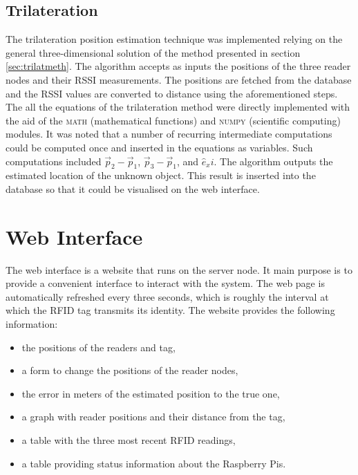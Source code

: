 \subsection{Trilateration}
\label{subsec:trilatimpl}


The trilateration position estimation technique was implemented relying on the general three-dimensional solution of the method presented in section \ref{sec:trilatmeth}. The algorithm accepts as inputs the positions of the three reader nodes and their RSSI measurements. The positions are fetched from the database and the RSSI values are converted to distance using the aforementioned steps. The all the equations of the trilateration method were directly implemented with the aid of the \textsc{math} (mathematical functions) and \textsc{numpy} (scientific computing) modules. It was noted that a number of recurring intermediate computations could be computed once and inserted in the equations as variables. Such computations included $\vec p_2 - \vec p_1$, $\vec p_3 - \vec p_1$, and $\hat e_x i$. The algorithm outputs the estimated location of the unknown object. This result is inserted into the database so that it could be visualised on the web interface.

\section{Web Interface}
\label{sec:webint}

The web interface is a website that runs on the server node. It main purpose is to provide a convenient interface to interact with the system. The web page is automatically refreshed every three seconds, which is roughly the interval at which the RFID tag transmits its identity. The website provides the following information:

\begin{itemize}
	\item the positions of the readers and tag,
	\item a form to change the positions of the reader nodes,
	\item the error in meters of the estimated position to the true one,
	\item a graph with reader positions and their distance from the tag,
	\item a table with the three most recent RFID readings,
	\item a table providing status information about the Raspberry Pis. 
\end{itemize}

